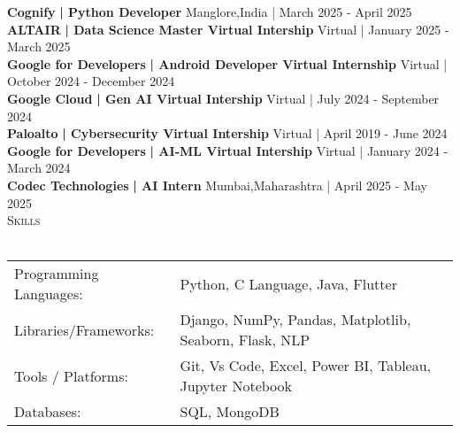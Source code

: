 \documentclass[a4paper]{article}
\newcommand{\lineunder} {
    \vspace*{-8pt} \\
    \hspace*{-18pt} \hrulefill \\
}
\newcommand{\header} [1] {
    {\hspace*{-18pt}\vspace*{6pt} \textsc{#1}}
    \vspace*{-6pt} \lineunder
}
\begin{document}
  \textbf{Cognify}\textbf{ | Python Developer} \hfill Manglore,India | March 2025 - April 2025\\
  \textbf{ALTAIR}\textbf{ | Data Science Master Virtual Intership} \hfill Virtual | January 2025 - March 2025\\
  \textbf{Google for Developers}\textbf{ | Android Developer Virtual Internship} \hfill Virtual | October 2024 - December 2024\\
  \textbf{Google Cloud}\textbf{ | Gen AI Virtual Intership} \hfill Virtual | July 2024 - September 2024\\
  \textbf{Paloalto}\textbf{ | Cybersecurity Virtual Intership} \hfill Virtual | April 2019 - June 2024\\
  \textbf{Google for Developers}\textbf{ | AI-ML Virtual Intership} \hfill Virtual | January 2024 - March 2024\\
  \textbf{Codec Technologies}\textbf{ | AI Intern} \hfill Mumbai,Maharashtra | April 2025 - May 2025\\

%
%
  \header{Skills}
  \vspace{2mm}
  \begin{longtable}{p{4cm}p{12cm}}
  Programming Languages: & Python, C Language, Java, Flutter \\
  Libraries/Frameworks: & Django, NumPy, Pandas, Matplotlib, Seaborn, Flask, NLP \\
  Tools / Platforms: & Git, Vs Code, Excel, Power BI, Tableau, Jupyter Notebook \\
  Databases: & SQL, MongoDB \\
  \end{longtable}
  \vspace{1mm}
\end{document}
